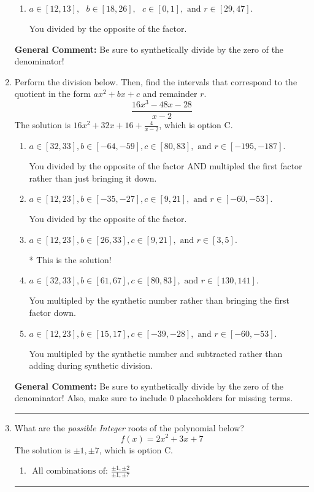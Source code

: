 \documentclass{extbook}[14pt]
\newcommand{\litem}[1]{\item #1

\rule{\textwidth}{0.4pt}}
\begin{document}
\begin{enumerate}
{\begin{enumerate}[label=\Alph*.]
 You multiplied by the synthetic number and subtracted rather than adding during synthetic division.
\item \( a \in [12, 13], \text{   } b \in [18, 26], \text{   } c \in [0, 1], \text{   and   } r \in [29, 47]. \)

 You divided by the opposite of the factor.
\end{enumerate}

\textbf{General Comment:} Be sure to synthetically divide by the zero of the denominator!
}
\litem{
Perform the division below. Then, find the intervals that correspond to the quotient in the form $ax^2+bx+c$ and remainder $r$.
\[ \frac{16x^{3} -48 x -28}{x -2} \]The solution is \( 16x^{2} +32 x + 16 + \frac{4}{x -2} \), which is option C.\begin{enumerate}[label=\Alph*.]
\item \( a \in [32, 33], b \in [-64, -59], c \in [80, 83], \text{ and } r \in [-195, -187]. \)

 You divided by the opposite of the factor AND multipled the first factor rather than just bringing it down.
\item \( a \in [12, 23], b \in [-35, -27], c \in [9, 21], \text{ and } r \in [-60, -53]. \)

 You divided by the opposite of the factor.
\item \( a \in [12, 23], b \in [26, 33], c \in [9, 21], \text{ and } r \in [3, 5]. \)

* This is the solution!
\item \( a \in [32, 33], b \in [61, 67], c \in [80, 83], \text{ and } r \in [130, 141]. \)

 You multipled by the synthetic number rather than bringing the first factor down.
\item \( a \in [12, 23], b \in [15, 17], c \in [-39, -28], \text{ and } r \in [-60, -53]. \)

 You multipled by the synthetic number and subtracted rather than adding during synthetic division.
\end{enumerate}

\textbf{General Comment:} Be sure to synthetically divide by the zero of the denominator! Also, make sure to include 0 placeholders for missing terms.
}
\litem{
What are the \textit{possible Integer} roots of the polynomial below?
\[ f(x) = 2x^{2} +3 x + 7 \]The solution is \( \pm 1,\pm 7 \), which is option C.\begin{enumerate}[label=\Alph*.]
\item \( \text{ All combinations of: }\frac{\pm 1,\pm 2}{\pm 1,\pm 7} \)


\end{enumerate}}
\end{enumerate}
\end{document}
